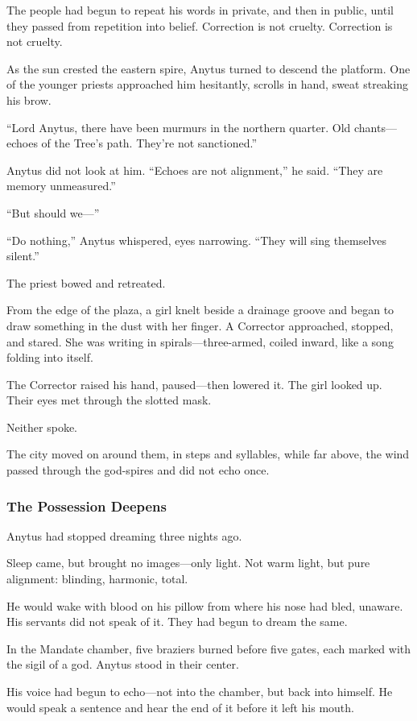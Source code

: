 \documentclass[12pt]{article}
\begin{document}
The people had begun to repeat his words in private, and then in public, until they passed from repetition into belief. Correction is not cruelty. Correction is not cruelty.

As the sun crested the eastern spire, Anytus turned to descend the platform. One of the younger priests approached him hesitantly, scrolls in hand, sweat streaking his brow.

“Lord Anytus, there have been murmurs in the northern quarter. Old chants—echoes of the Tree’s path. They’re not sanctioned.”

Anytus did not look at him. “Echoes are not alignment,” he said. “They are memory unmeasured.”

“But should we—”

“Do nothing,” Anytus whispered, eyes narrowing. “They will sing themselves silent.”

The priest bowed and retreated.

From the edge of the plaza, a girl knelt beside a drainage groove and began to draw something in the dust with her finger. A Corrector approached, stopped, and stared. She was writing in spirals—three-armed, coiled inward, like a song folding into itself.

The Corrector raised his hand, paused—then lowered it. The girl looked up. Their eyes met through the slotted mask.

Neither spoke.

The city moved on around them, in steps and syllables, while far above, the wind passed through the god-spires and did not echo once.

\dotfill

\subsubsection{The Possession Deepens}

Anytus had stopped dreaming three nights ago.

Sleep came, but brought no images—only light. Not warm light, but pure alignment: blinding, harmonic, total. 

He would wake with blood on his pillow from where his nose had bled, unaware. His servants did not speak of it. They had begun to dream the same.

In the Mandate chamber, five braziers burned before five gates, each marked with the sigil of a god. Anytus stood in their center. 

His voice had begun to echo—not into the chamber, but back into himself. He would speak a sentence and hear the end of it before it left his mouth.
\end{document}

